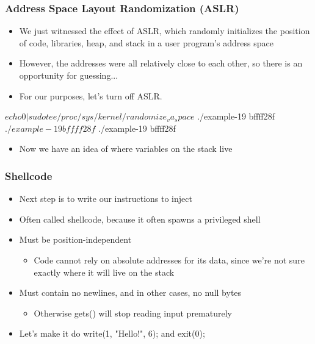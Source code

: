 \documentclass[11pt,xcolor=dvipsnames]{beamer}
\newcommand{\vs}{\vspace{0.5em}}
\begin{document}
\begin{frame}[fragile,t]
\frametitle{Address Space Layout Randomization (ASLR)}
\begin{itemize}
  \item We just witnessed the effect of ASLR, which randomly initializes the position of code, libraries, heap, and stack in a user program's address space
  \item However, the addresses were all relatively close to each other, so there is an opportunity for guessing...
  \item For our purposes, let's turn off ASLR.
\end{itemize}
\vs
\begin{textcode}
$ echo 0 | sudo tee /proc/sys/kernel/randomize_va_space
$ ./example-19
bffff28f
$ ./example-19
bffff28f
$ ./example-19
bffff28f
\end{textcode}
\begin{itemize}
  \item Now we have an idea of where variables on the stack live
\end{itemize}
\end{frame}

\begin{frame}[fragile,t]
\frametitle{Shellcode}
\begin{itemize}
  \item Next step is to write our instructions to inject
  \item Often called shellcode, because it often spawns a privileged shell
  \pause
  \vs\vs
  \item Must be position-independent
  \begin{itemize}
    \item Code cannot rely on absolute addresses for its data, since we're not sure exactly where it will live on the stack
  \end{itemize}
  \pause
  \item Must contain no newlines, and in other cases, no null bytes
  \begin{itemize}
    \item Otherwise {\ttfamily gets()} will stop reading input prematurely
  \end{itemize}
  \pause
  \vs
  \item Let's make it do {\ttfamily write(1, "Hello!", 6);} and {\ttfamily exit(0);}
\end{itemize}
\end{frame}
\end{document}
